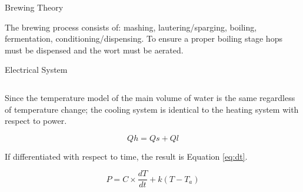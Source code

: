 \documentclass[final]{beamer}
\newlength{\onecolwid}
\newlength{\twocolwid}
\begin{document}
\begin{frame}[t]
\begin{columns}[t]
\begin{column}{\twocolwid}
\begin{columns}[t,totalwidth=\twocolwid]
\begin{column}{\onecolwid}

\end{column} %

\end{columns} %


\begin{alertblock}{Brewing Theory}

The brewing process consists of: mashing, lautering/sparging, boiling, fermentation, conditioning/dispensing.  To ensure a proper boiling stage hops must be dispensed and the wort must be aerated.

\end{alertblock} 


\begin{block}{Electrical System}
\end{block}

\begin{columns}[t,totalwidth=\twocolwid] %

\begin{column}{\onecolwid} %
Since the temperature model of the main volume of water is the same regardless of  temperature change; the cooling system is identical to the heating system with respect to power.

\begin{equation}
Qh = Qs + Ql
\label{eq:heat-system}
\end{equation}

\noindent If differentiated with respect to time, the result is Equation \ref{eq:dt}.

\begin{equation}
P = C \times \frac{dT}{dt} + k(T - T_{a})
\label{eq:dt}
\end{equation}


\end{column}
\end{columns}
\end{column}
\end{columns}
\end{frame}
\end{document}
